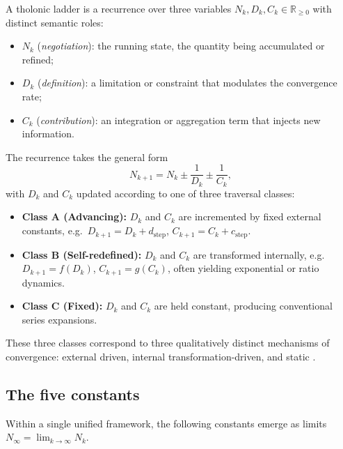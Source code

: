 \documentclass[12pt]{article}
\begin{document}
A tholonic ladder is a recurrence over three variables $N_k, D_k, C_k \in \mathbb{R}_{\geq 0}$
with distinct semantic roles:
\begin{itemize}
  \item $N_k$ (\emph{negotiation}): the running state, the quantity being accumulated or refined;
  \item $D_k$ (\emph{definition}): a limitation or constraint that modulates the convergence rate;
  \item $C_k$ (\emph{contribution}): an integration or aggregation term that injects new information.
\end{itemize}
The recurrence takes the general form
\[
  N_{k+1} = N_k \pm \frac{1}{D_k} \pm \frac{1}{C_k},
\]
with $D_k$ and $C_k$ updated according to one of three traversal classes:
\begin{itemize}
  \item \textbf{Class A (Advancing):} $D_k$ and $C_k$ are incremented by fixed external constants,
        e.g.\ $D_{k+1} = D_k + d_{\mathrm{step}}$, $C_{k+1} = C_k + c_{\mathrm{step}}$.
  \item \textbf{Class B (Self-redefined):} $D_k$ and $C_k$ are transformed internally,
        e.g.\ $D_{k+1} = f(D_k)$, $C_{k+1} = g(C_k)$, often yielding exponential or ratio dynamics.
  \item \textbf{Class C (Fixed):} $D_k$ and $C_k$ are held constant, producing conventional series
        expansions.
\end{itemize}
These three classes correspond to three qualitatively distinct mechanisms of convergence:
external driven, internal transformation-driven, and static \cite[Section~3]{Mil24}.

\subsection{The five constants}\label{sec:five-constants}

Within a single unified framework, the following constants emerge as limits
$N_\infty = \lim_{k \to \infty} N_k$.
\end{document}
